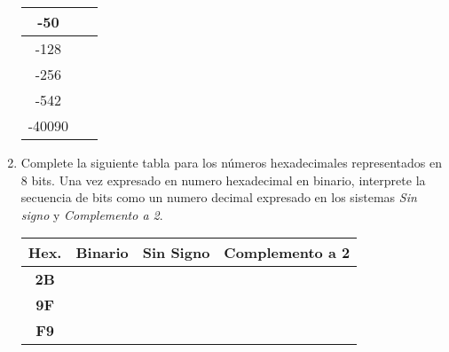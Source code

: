 \documentclass[12pt]{article}
\begin{document}
\begin{enumerate}
\begin{center}
\begin{tabular}[t]{|c|c|}
            \hline

                -50 & \hspace{27em}~ \\

            \hline

                -128&\\

            \hline

                -256&\\

            \hline

                -542&\\

            \hline

                -40090&\\

            \hline

            \end{tabular}

        \end{center}

    \item Complete la siguiente tabla para los números hexadecimales
        representados en 8 bits. Una vez expresado en numero hexadecimal en
        binario, interprete la secuencia de bits como un numero decimal
        expresado en los sistemas \emph{Sin signo} y \emph{Complemento a 2}.

        \begin{center}

            \begin{tabular}[t]{|c|c|c|c|}

            \hline

                \textbf{Hex.} & \textbf{Binario} & \textbf{Sin Signo} & \textbf{Complemento a 2}\\

            \hline

                \textbf{2B} & \hspace{9em}~ &~&~\\

            \hline

            \textbf{9F}&&&\\

            \hline

            \textbf{F9}&&&\\

            \hline


\end{tabular}
\end{center}
\end{enumerate}
\end{document}

